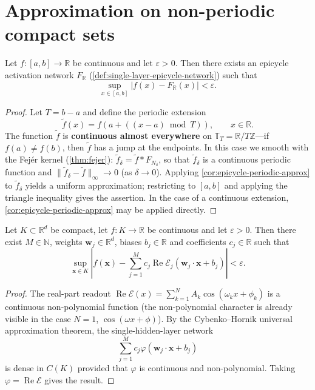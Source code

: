 \section{Approximation on non-periodic compact sets}

\begin{theorem}\label{thm:compact-interval-approx}
Let $f:[a,b]\to\mathbb R$ be continuous and let $\varepsilon>0$. Then there exists an epicycle activation network $F_{\mathbb R}$ (\cref{def:single-layer-epicycle-network}) such that
\[
\sup_{x\in[a,b]}|f(x)-F_{\mathbb R}(x)|<\varepsilon.
\]
\end{theorem}

\begin{proof}
Let $T=b-a$ and define the periodic extension
\[
\tilde f(x)=f\left(a+\left((x-a)\bmod T\right)\right),\qquad x\in\mathbb R.
\]
The function $\tilde f$ is \textbf{continuous almost everywhere} on $\mathbb T_T=\mathbb R/T\mathbb Z$---if $f(a)\neq f(b)$, then $\tilde f$ has a jump at the endpoints. In this case we smooth with the Fejér kernel (\cref{thm:fejer}): $\tilde f_\delta = \tilde f * F_{N_\delta}$, so that $\tilde f_\delta$ is a continuous periodic function and $\|\tilde f_\delta - \tilde f\|_\infty\to 0$ (as $\delta\to0$). Applying \cref{cor:epicycle-periodic-approx} to $\tilde f_\delta$ yields a uniform approximation; restricting to $[a,b]$ and applying the triangle inequality gives the assertion. In the case of a continuous extension, \cref{cor:epicycle-periodic-approx} may be applied directly.
\end{proof}

\begin{theorem}\label{thm:universal-approx-epicycle}
Let $K\subset\mathbb R^d$ be compact, let $f:K\to\mathbb R$ be continuous and let $\varepsilon>0$. Then there exist $M\in\mathbb N$, weights $\mathbf w_j\in\mathbb R^d$, biases $b_j\in\mathbb R$ and coefficients $c_j\in\mathbb R$ such that
\[
\sup_{\mathbf x\in K}\left|f(\mathbf x)-\sum_{j=1}^{M}c_j\operatorname{Re}\mathcal E_j(\mathbf w_j\cdot\mathbf x+b_j)\right|<\varepsilon.
\]
\end{theorem}

\begin{proof}
The real-part readout $\operatorname{Re}\mathcal E(x)=\sum_{k=1}^{N}A_k\cos(\omega_k x+\phi_k)$ is a continuous non-polynomial function (the non-polynomial character is already visible in the case $N=1$, $\cos(\omega x+\phi)$). By the Cybenko--Hornik universal approximation theorem, the single-hidden-layer network
\[
\sum_{j=1}^{M}c_j\varphi(\mathbf w_j\cdot\mathbf x+b_j)
\]
is dense in $C(K)$ provided that $\varphi$ is continuous and non-polynomial. Taking $\varphi=\operatorname{Re}\mathcal E$ gives the result.
\end{proof}

